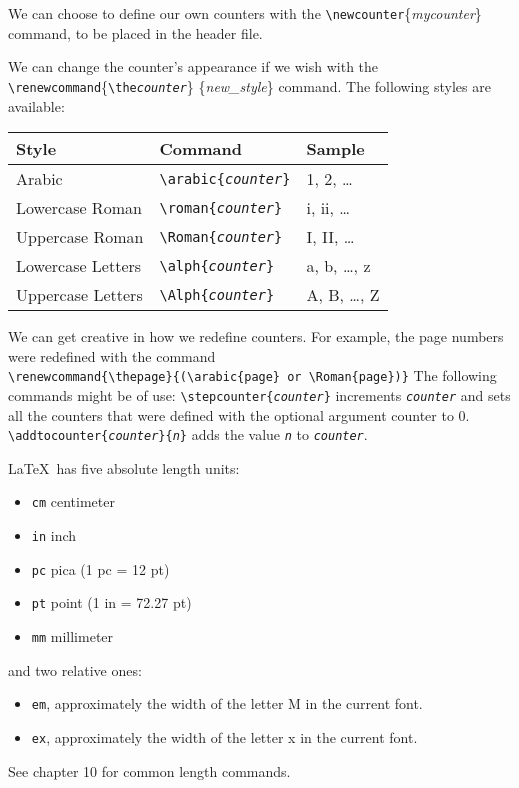 \documentclass{amsart}
\renewcommand{\thepage}{(\arabic{page} or \Roman{page})}
\begin{document}
	We can choose to define our own counters with the 
	\verb+\newcounter+\{\emph{mycounter}\} command, to be placed in the
	header file.

	We can change the counter's appearance if we wish with the\\
	\verb+\renewcommand+\{\texttt{\textbackslash the\emph{counter}}\}%
		\{\emph{new\_style}\} command. 
	The following styles are available: \\
	\begin{center}
		\begin{tabular}{l l l}
			\hline
			Style 	
				& 	Command 	
				& Sample
 				\\ \hline
			Arabic 	
				& \texttt{\textbackslash arabic\{\emph{counter}\}}
				& 1, 2, \dots 
				\\
			Lowercase Roman
				& \texttt{\textbackslash roman\{\emph{counter}\}}
				& i, ii, \dots
				\\
			Uppercase Roman
				& \texttt{\textbackslash Roman\{\emph{counter}\}}
				& I, II, \dots
				\\
			Lowercase Letters
				& \texttt{\textbackslash alph\{\emph{counter}\}}
				& a, b, \dots, z
				\\
			Uppercase Letters
				& \texttt{\textbackslash Alph\{\emph{counter}\}}
				& A, B, \dots, Z
				\\ \hline
		\end{tabular}
	\end{center}
	We can get creative in how we redefine counters. 
	For example, the page numbers were redefined with the command \\
	\verb+\renewcommand{\thepage}{(\arabic{page} or \Roman{page})}+
	The following commands might be of use:
	\texttt{\textbackslash stepcounter\{\emph{counter}\}} increments
	\texttt{\emph{counter}} and sets all the counters that were 
	defined with the optional argument counter to 0.
	\texttt{\textbackslash addtocounter\{\emph{counter}\}\{\emph{n}\}}
	adds the value \texttt{\emph{n}} to \texttt{\emph{counter}}.
	
	\LaTeX\ has five absolute length units:
	\begin{itemize}
		\item \texttt{cm} centimeter
		\item \texttt{in} inch
		\item \texttt{pc} pica (1 pc = 12 pt)
		\item \texttt{pt} point (1 in = 72.27 pt)
		\item \texttt{mm} millimeter
	\end{itemize}
	and two relative ones:
	\begin{itemize}
		\item \texttt{em}, approximately the width of the letter M 
			in the current font.
		\item \texttt{ex}, approximately the width of the letter x
			in the current font.
	\end{itemize}
	See chapter 10 for common length commands. 
\end{document}
